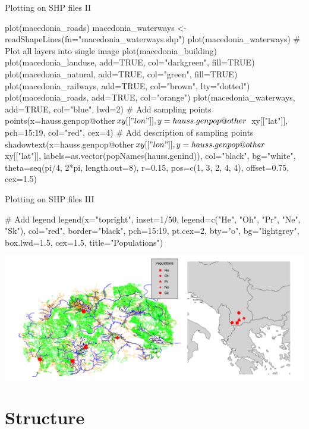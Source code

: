 \documentclass[compress, ucs, xelatex, 11pt, xcolor=svgnames,
  hyperref={
    bookmarks=true,
    unicode=true,
    colorlinks=true,
    pdftitle={Molecular data in R},
    plainpages=false,
    pdfauthor={Vojtech Zeisek},
    pdfsubject={Course about phylogeny and evolution in R},
    pdfcreator={XeLaTeX},
    pdfkeywords={R, evolution, phylogeny, molecular data},
    linkcolor=Tomato,
    anchorcolor=SaddleBrown,
    citecolor=Goldenrod,
    filecolor=DarkMagenta,
    menucolor=Sienna,
    urlcolor=DarkTurquoise,
    pdftex},
  url={hyphens, lowtilde} %
  ]{beamer}
\begin{document}
\begin{frame}[fragile]{Plotting on SHP files II}
  \begin{spluscode}
    plot(macedonia_roads)
    macedonia_waterways <- readShapeLines(fn="macedonia_waterways.shp")
    plot(macedonia_waterways)
    # Plot all layers into single image
    plot(macedonia_building)
    plot(macedonia_landuse, add=TRUE, col="darkgreen", fill=TRUE)
    plot(macedonia_natural, add=TRUE, col="green", fill=TRUE)
    plot(macedonia_railways, add=TRUE, col="brown", lty="dotted")
    plot(macedonia_roads, add=TRUE, col="orange")
    plot(macedonia_waterways, add=TRUE, col="blue", lwd=2)
    # Add sampling points
    points(x=hauss.genpop@other$xy[["lon"]], y=hauss.genpop@other$
      xy[["lat"]], pch=15:19, col="red", cex=4)
    # Add description of sampling points
    shadowtext(x=hauss.genpop@other$xy[["lon"]], y=hauss.genpop@other$
      xy[["lat"]], labels=as.vector(popNames(hauss.genind)), col="black",
      bg="white", theta=seq(pi/4, 2*pi, length.out=8), r=0.15,
      pos=c(1, 3, 2, 4, 4), offset=0.75, cex=1.5)
  \end{spluscode}
\end{frame}

\begin{frame}[fragile]{Plotting on SHP files III}
  \begin{spluscode}
    # Add legend
    legend(x="topright", inset=1/50, legend=c("He", "Oh", "Pr", "Ne",
      "Sk"), col="red", border="black", pch=15:19, pt.cex=2, bty="o",
      bg="lightgrey", box.lwd=1.5, cex=1.5, title="Populations")
  \end{spluscode}
\includegraphics[width=\textwidth]{mapy.png}
\end{frame}

\section{Structure}
\end{document}
